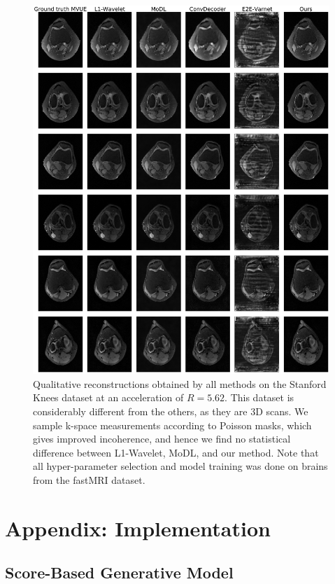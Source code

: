 \begin{figure}
    \centering
    \includegraphics[width=\columnwidth]{stanford_knee-poisson-5.62-mvue-comp.pdf}
    \caption{Qualitative reconstructions obtained by all methods on the Stanford Knees dataset at an acceleration of $R=5.62$. This dataset is considerably different from the others, as they are 3D scans. We sample k-space measurements according to Poisson masks, which gives improved incoherence, and hence we find no statistical difference between L1-Wavelet, MoDL, and our method. Note that all hyper-parameter selection and model training was done on brains from the fastMRI dataset.}
    \label{fig:stanford-recons-5.62}
\end{figure}


\section{Appendix: Implementation}\label{app:implementation}

\subsection{Score-Based Generative Model}

